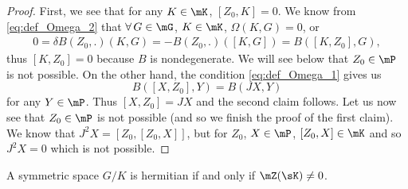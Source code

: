 \begin{proof}
First, we see that for any $K\in\mK$, $[Z_0,K]=0$. We know from \eqref{eq:def_Omega_2} that $\forall\,G\in\mG$, $K\in\mK$, $\Omega(K,G)=0$, or
\begin{equation}
\begin{split}
  0=\delta B(Z_0,.)(K,G)=-B(Z_0,.)([K,G])
                       =B([K,Z_0],G),
\end{split}
\end{equation}
thus $[K,Z_0]=0$ because $B$ is nondegenerate. We will see below that $Z_0\in\mP$ is not possible.  On the other hand, the condition \eqref{eq:def_Omega_1} gives us
\[
  B( [X,Z_0],Y )=B(JX,Y)
\]
for any $Y\in\mP$. Thus $[X,Z_0]=JX$ and the second claim follows. Let us now see that $Z_0\in\mP$ is not possible (and so we finish the proof of the first claim). We know that $J^2X=[Z_0,[Z_0,X]]$, but for $Z_0$, $X\in\mP$, $[Z_0,X]\in\mK$ and so $J^2X=0$ which is not possible.

\end{proof}


\begin{lemma}
A symmetric space $G/K$ is hermitian if and only if $\mZ(\sK)\neq 0$.
\end{lemma}


